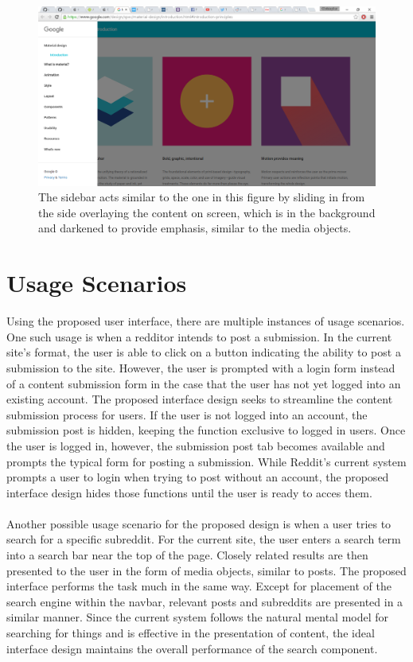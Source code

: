 \documentclass{article}
\begin{document}
\begin{figure}[H]
\begin{center}
\includegraphics[width=1\textwidth]{sidebar.png}
\caption{The sidebar acts similar to the one in this figure by sliding in from the side overlaying the content on screen, which is in the background and darkened to provide emphasis, similar to the media objects.}
\end{center}
\end{figure}

\section{Usage Scenarios} Using the proposed user interface, there are multiple instances of usage scenarios. One such usage is when a redditor intends to post a submission. In the current site's format, the user is able to click on a button indicating the ability to post a submission to the site. However, the user is prompted with a login form instead of a content submission form in the case that the user has not yet logged into an existing account. The proposed interface design seeks to streamline the content submission process for users. If the user is not logged into an account, the submission post is hidden, keeping the function exclusive to logged in users. Once the user is logged in, however, the submission post tab becomes available and prompts the typical form for posting a submission. While Reddit's current system prompts a user to login when trying to post without an account, the proposed interface design hides those functions until the user is ready to acces them.\\
\\
\indent Another possible usage scenario for the proposed design is when a user tries to search for a specific subreddit. For the current site, the user enters a search term into a search bar near the top of the page. Closely related results are then presented to the user in the form of media objects, similar to posts. The proposed interface performs the task much in the same way. Except for placement of the search engine within the navbar, relevant posts and subreddits are presented in a similar manner. Since the current system follows the natural mental model for searching for things and is effective in the presentation of content, the ideal interface design maintains the overall performance of the search component.
\end{document}

